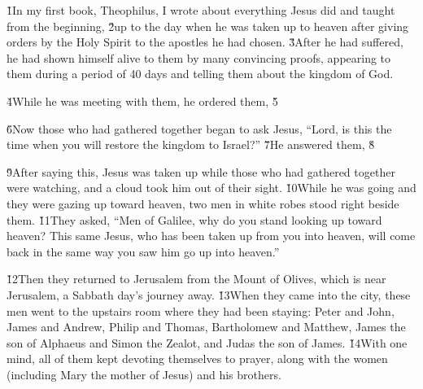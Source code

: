 


\v{1}In my first book, Theophilus, I wrote about everything Jesus did and taught from the beginning, \v{2}up to the day when he was taken up to heaven after giving orders by the Holy Spirit to the apostles he had chosen. \v{3}After he had suffered, he had shown himself alive to them by many convincing proofs, appearing to them during a period of 40 days and telling them about the kingdom of God.

\v{4}While he was meeting with them, he ordered them, \red{,} \v{5}   

\v{6}Now those who had gathered together began to ask Jesus, ``Lord, is this the time when you will restore the kingdom to Israel?'' \v{7}He answered them,  \v{8}

\v{9}After saying this, Jesus was taken up while those who had gathered together were watching, and a cloud took him out of their sight. \v{10}While he was going and they were gazing up toward heaven, two men in white robes stood right beside them. \v{11}They asked, ``Men of Galilee, why do you stand looking up toward heaven? This same Jesus, who has been taken up from you into heaven, will come back in the same way you saw him go up into heaven.''

\v{12}Then they returned to Jerusalem from the Mount of Olives, which is near Jerusalem, a Sabbath day's journey away. \v{13}When they came into the city, these men went to the upstairs room where they had been staying: Peter and John, James and Andrew, Philip and Thomas, Bartholomew and Matthew, James the son of Alphaeus and Simon the Zealot, and Judas the son of James. \v{14}With one mind, all of them kept devoting themselves to prayer, along with the women (including Mary the mother of Jesus) and his brothers.

